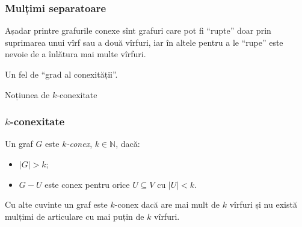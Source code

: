 \begin{frame}
  \frametitle{Mulțimi separatoare}

Așadar printre grafurile conexe sînt grafuri care pot fi ``rupte'' doar prin suprimarea unui vîrf sau a două vîrfuri, iar în altele pentru a le ``rupe'' este nevoie de a înlătura mai multe vîrfuri.\pause

Un fel de ``grad al conexității''.\pause

Noțiunea de $k$-conexitate

\end{frame}

\begin{frame}
  \frametitle{$k$-conexitate}

Un graf $G$ este \emph{$k$-conex}, $k\in\mathbb{N}$, dacă:
\begin{itemize}
  \item $|G|>k$;
  \item $G-U$ este conex pentru orice $U\subseteq V$ cu $|U|<k$.
\end{itemize}\pause

Cu alte cuvinte un graf este $k$-conex dacă are mai mult de $k$ vîrfuri și nu există mulțimi de articulare cu mai puțin de $k$ vîrfuri.

\end{frame}


